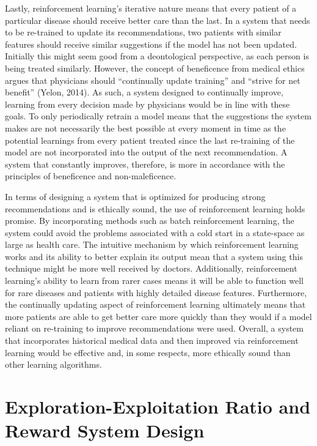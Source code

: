 \documentclass[]{spie}  %
\begin{document}
Lastly, reinforcement learning’s iterative nature means that every patient of a particular disease should receive better care than the last. In a system that needs to be re-trained to update its recommendations, two patients with similar features should receive similar suggestions if the model has not been updated. Initially this might seem good from a deontological perspective, as each person is being treated similarly. However, the concept of beneficence from medical ethics argues that physicians should “continually update training” and “strive for net benefit” (Yelon, 2014). As such, a system designed to continually improve, learning from every decision made by physicians would be in line with these goals. To only periodically retrain a model means that the suggestions the system makes are not necessarily the best possible at every moment in time as the potential learnings from every patient treated since the last re-training of the model are not incorporated into the output of the next recommendation. A system that constantly improves, therefore, is more in accordance with the principles of beneficence and non-maleficence.

In terms of designing a system that is optimized for producing strong recommendations and is ethically sound, the use of reinforcement learning holds promise. By incorporating methods such as batch reinforcement learning, the system could avoid the problems associated with a cold start in a state-space as large as health care. The intuitive mechanism by which reinforcement learning works and its ability to better explain its output mean that a system using this technique might be more well received by doctors. Additionally, reinforcement learning’s ability to learn from rarer cases means it will be able to function well for rare diseases and patients with highly detailed disease features. Furthermore, the continually updating aspect of reinforcement learning ultimately means that more patients are able to get better care more quickly than they would if a model reliant on re-training to improve recommendations were used. Overall, a system that incorporates historical medical data and then improved via reinforcement learning would be effective and, in some respects, more ethically sound than other learning algorithms.

\section{Exploration-Exploitation Ratio and Reward System Design}
\end{document}
